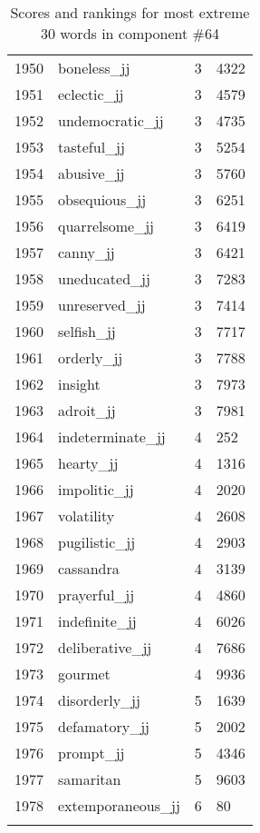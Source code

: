 \begin{longtable}[!htbp]{| rlr@{.}l |}
    1950 & boneless\_jj & 3 & 4322 \\
    1951 & eclectic\_jj & 3 & 4579 \\
    1952 & undemocratic\_jj & 3 & 4735 \\
    1953 & tasteful\_jj & 3 & 5254 \\
    1954 & abusive\_jj & 3 & 5760 \\
    1955 & obsequious\_jj & 3 & 6251 \\
    1956 & quarrelsome\_jj & 3 & 6419 \\
    1957 & canny\_jj & 3 & 6421 \\
    1958 & uneducated\_jj & 3 & 7283 \\
    1959 & unreserved\_jj & 3 & 7414 \\
    1960 & selfish\_jj & 3 & 7717 \\
    1961 & orderly\_jj & 3 & 7788 \\
    1962 & insight & 3 & 7973 \\
    1963 & adroit\_jj & 3 & 7981 \\
    1964 & indeterminate\_jj & 4 & 252 \\
    1965 & hearty\_jj & 4 & 1316 \\
    1966 & impolitic\_jj & 4 & 2020 \\
    1967 & volatility & 4 & 2608 \\
    1968 & pugilistic\_jj & 4 & 2903 \\
    1969 & cassandra & 4 & 3139 \\
    1970 & prayerful\_jj & 4 & 4860 \\
    1971 & indefinite\_jj & 4 & 6026 \\
    1972 & deliberative\_jj & 4 & 7686 \\
    1973 & gourmet & 4 & 9936 \\
    1974 & disorderly\_jj & 5 & 1639 \\
    1975 & defamatory\_jj & 5 & 2002 \\
    1976 & prompt\_jj & 5 & 4346 \\
    1977 & samaritan & 5 & 9603 \\
    1978 & extemporaneous\_jj & 6 & 80 \\
    \hline
    \caption{Scores and rankings for most extreme 30 words in component \#64} \\
\end{longtable}
